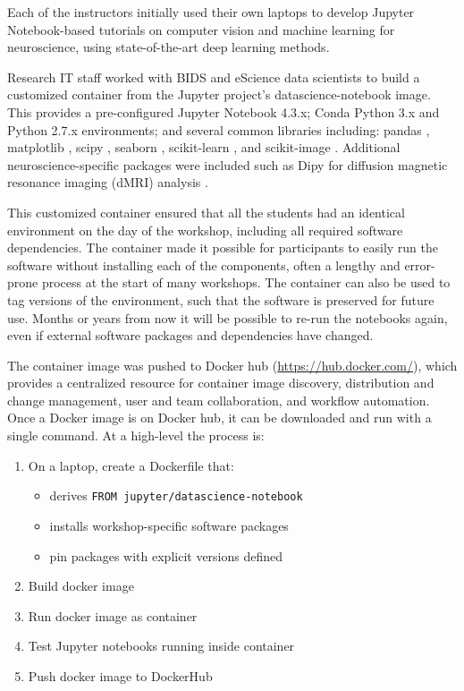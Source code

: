 Each of the instructors initially used their own laptops to develop Jupyter
Notebook-based tutorials on computer vision and machine learning for
neuroscience, using state-of-the-art deep learning methods.

Research IT staff worked with BIDS and eScience data scientists to build a
customized container from the Jupyter project's datascience-notebook image. This
provides a pre-configured Jupyter Notebook 4.3.x; Conda Python 3.x and Python
2.7.x environments; and several common libraries including: pandas
\cite{mckinney-proc-scipy-2010}, matplotlib \cite{hunter2007matplotlib}, scipy
\cite{scipy}, seaborn \cite{michael_waskom_2014_12710}, scikit-learn
\cite{Pedregosa2012-dm}, and scikit-image \cite{van2014scikit}. Additional
neuroscience-specific packages were included such as Dipy for diffusion magnetic
resonance imaging (dMRI) analysis \cite{Garyfallidis2014FrontNeuroinf}.

This customized container ensured that all the students had an identical
environment on the day of the workshop, including all required software
dependencies. The container made it possible for participants to easily run the
software without installing each of the components, often a lengthy and
error-prone process at the start of many workshops. The container can also be
used to tag versions of the environment, such that the software is preserved
for future use. Months or years from now it will be possible to re-run the
notebooks again, even if external software packages and dependencies have
changed.

The container image was pushed to Docker hub (\url{https://hub.docker.com/}),
which provides a centralized resource for container image discovery,
distribution and change management, user and team collaboration, and workflow
automation. Once a Docker image is on Docker hub, it can be downloaded and run
with a single command. At a high-level the process is:

\begin{enumerate}
  \item On a laptop, create a Dockerfile that:
  \begin{itemize}
    \item derives \texttt{FROM jupyter/datascience-notebook}
    \item installs workshop-specific software packages
    \item pin packages with explicit versions defined
  \end{itemize}
  \item Build docker image
  \item Run docker image as container
  \item Test Jupyter notebooks running inside container
  \item Push docker image to DockerHub
\end{enumerate}


